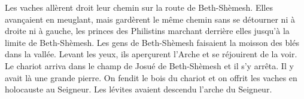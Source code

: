 Les vaches allèrent droit leur chemin sur la route de Beth-Shèmesh.
Elles avançaient en meuglant,
	mais gardèrent le même chemin sans se détourner ni à droite ni à gauche,
	les princes des Philistins marchant derrière elles jusqu’à la limite de Beth-Shèmesh.
Les gens de Beth-Shèmesh faisaient la moisson des blés dans la vallée.
	Levant les yeux, ils aperçurent l’Arche et se réjouirent de la voir.
Le chariot arriva dans le champ de Josué de Beth-Shèmesh et il s’y arrêta.
Il y avait là une grande pierre.
	On fendit le bois du chariot et on offrit les vaches en holocauste au Seigneur.
Les lévites avaient descendu l’arche du Seigneur.
